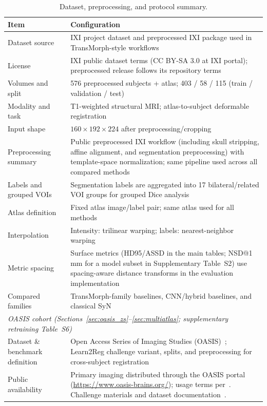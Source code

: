 \documentclass[jimaging,article,submit,pdftex,moreauthors]{Definitions/mdpi}
\begin{document}
\begin{table}[H]
\caption{Dataset, preprocessing, and protocol summary.\label{tab1}}
\begin{tabularx}{\textwidth}{lX}
\toprule
\textbf{Item} & \textbf{Configuration} \\
\midrule
Dataset source & IXI project dataset \cite{ixidataset} and preprocessed IXI package used in TransMorph-style workflows \\
License & IXI public dataset terms (CC BY-SA 3.0 at IXI portal); preprocessed release follows its repository terms \\
Volumes and split & 576 preprocessed subjects + atlas; 403 / 58 / 115 (train / validation / test) \\
Modality and task & T1-weighted structural MRI; atlas-to-subject deformable registration \\
Input shape & \(160 \times 192 \times 224\) after preprocessing/cropping \\
Preprocessing summary & Public preprocessed IXI workflow (including skull stripping, affine alignment, and segmentation preprocessing) with template-space normalization; same pipeline used across all compared methods \\
Labels and grouped VOIs & Segmentation labels are aggregated into 17 bilateral/related VOI groups for grouped Dice analysis \\
Atlas definition & Fixed atlas image/label pair; same atlas used for all methods \\
Interpolation & Intensity: trilinear warping; labels: nearest-neighbor warping \\
Metric spacing & Surface metrics (HD95/ASSD in the main tables; NSD@1\,mm for a model subset in Supplementary Table~S2) use spacing-aware distance transforms in the evaluation implementation \\
Compared families & TransMorph-family baselines, CNN/hybrid baselines, and classical SyN \\
\midrule
\multicolumn{2}{l}{\textit{OASIS cohort (Sections~\ref{sec:oasis_zs}--\ref{sec:multiatlas}; supplementary retraining Table~S6)}} \\
Dataset \& benchmark definition & Open Access Series of Imaging Studies (OASIS)~\cite{marcus2007oasis}; Learn2Reg challenge variant, splits, and preprocessing for cross-subject registration~\cite{hering2023learn2reg} \\
Public availability & Primary imaging distributed through the OASIS portal (\url{https://www.oasis-brains.org/}); usage terms per~\cite{marcus2007oasis}. Challenge materials and dataset documentation~\cite{hering2023learn2reg}. \\
\bottomrule
\end{tabularx}
\end{table}
\end{document}
